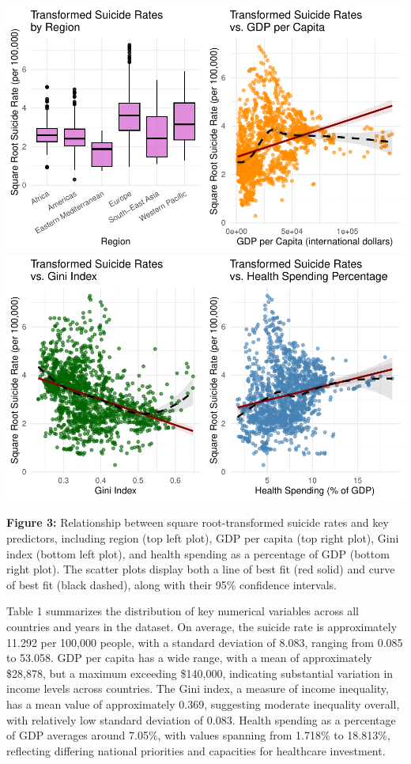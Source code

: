 \documentclass[
]{article}
\begin{document}
\includegraphics{final_report_files/figure-latex/suicide-against-numeric-transformed-1.pdf}
\includegraphics{final_report_files/figure-latex/suicide-against-numeric-transformed-2.pdf}

\textbf{Figure 3:} Relationship between square root-transformed suicide
rates and key predictors, including region (top left plot), GDP per
capita (top right plot), Gini index (bottom left plot), and health
spending as a percentage of GDP (bottom right plot). The scatter plots
display both a line of best fit (red solid) and curve of best fit (black
dashed), along with their 95\% confidence intervals.

\newpage

Table 1 summarizes the distribution of key numerical variables across
all countries and years in the dataset. On average, the suicide rate is
approximately 11.292 per 100,000 people, with a standard deviation of
8.083, ranging from 0.085 to 53.058. GDP per capita has a wide range,
with a mean of approximately \$28,878, but a maximum exceeding
\$140,000, indicating substantial variation in income levels across
countries. The Gini index, a measure of income inequality, has a mean
value of approximately 0.369, suggesting moderate inequality overall,
with relatively low standard deviation of 0.083. Health spending as a
percentage of GDP averages around 7.05\%, with values spanning from
1.718\% to 18.813\%, reflecting differing national priorities and
capacities for healthcare investment.
\end{document}
